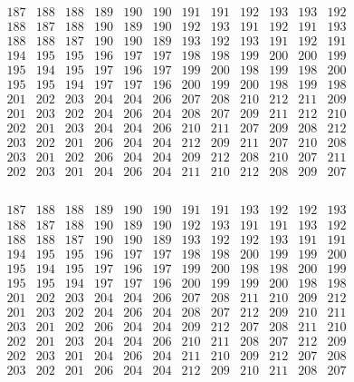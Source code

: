 \documentclass[11pt,a4paper]{amsart}
\begin{document}
\begin{align*}
  \begin{array}{ccc|ccc|cccccc}
    187 & 188 & 188 & 189 & 190 & 190 & 191 & 191 & 192 & 193 & 193 & 192 \\
    188 & 187 & 188 & 190 & 189 & 190 & 192 & 193 & 191 & 192 & 191 & 193 \\
    188 & 188 & 187 & 190 & 190 & 189 & 193 & 192 & 193 & 191 & 192 & 191 \\
\hline
    194 & 195 & 195 & 196 & 197 & 197 & 198 & 198 & 199 & 200 & 200 & 199 \\
    195 & 194 & 195 & 197 & 196 & 197 & 199 & 200 & 198 & 199 & 198 & 200 \\
    195 & 195 & 194 & 197 & 197 & 196 & 200 & 199 & 200 & 198 & 199 & 198 \\
\hline
    201 & 202 & 203 & 204 & 204 & 206 & 207 & 208 & 210 & 212 & 211 & 209 \\
    201 & 203 & 202 & 204 & 206 & 204 & 208 & 207 & 209 & 211 & 212 & 210 \\
    202 & 201 & 203 & 204 & 204 & 206 & 210 & 211 & 207 & 209 & 208 & 212 \\
    203 & 202 & 201 & 206 & 204 & 204 & 212 & 209 & 211 & 207 & 210 & 208 \\
    203 & 201 & 202 & 206 & 204 & 204 & 209 & 212 & 208 & 210 & 207 & 211 \\
    202 & 203 & 201 & 204 & 206 & 204 & 211 & 210 & 212 & 208 & 209 & 207 \\
  \end{array}
\end{align*}

\begin{align*}
  \begin{array}{ccc|ccc|cccccc}
    187 & 188 & 188 & 189 & 190 & 190 & 191 & 191 & 193 & 192 & 192 & 193 \\
    188 & 187 & 188 & 190 & 189 & 190 & 192 & 193 & 191 & 191 & 193 & 192 \\
    188 & 188 & 187 & 190 & 190 & 189 & 193 & 192 & 192 & 193 & 191 & 191 \\
\hline
    194 & 195 & 195 & 196 & 197 & 197 & 198 & 198 & 200 & 199 & 199 & 200 \\
    195 & 194 & 195 & 197 & 196 & 197 & 199 & 200 & 198 & 198 & 200 & 199 \\
    195 & 195 & 194 & 197 & 197 & 196 & 200 & 199 & 199 & 200 & 198 & 198 \\
\hline
    201 & 202 & 203 & 204 & 204 & 206 & 207 & 208 & 211 & 210 & 209 & 212 \\
    201 & 203 & 202 & 204 & 206 & 204 & 208 & 207 & 212 & 209 & 210 & 211 \\
    203 & 201 & 202 & 206 & 204 & 204 & 209 & 212 & 207 & 208 & 211 & 210 \\
    202 & 201 & 203 & 204 & 204 & 206 & 210 & 211 & 208 & 207 & 212 & 209 \\
    202 & 203 & 201 & 204 & 206 & 204 & 211 & 210 & 209 & 212 & 207 & 208 \\
    203 & 202 & 201 & 206 & 204 & 204 & 212 & 209 & 210 & 211 & 208 & 207 \\
  \end{array}
\end{align*}
\end{document}
